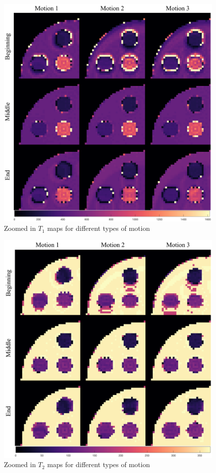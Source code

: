 \begin{figure}[ht]
    \centering
    \includegraphics[width=1\textwidth]{images/mrf/T1mapsmotionzoom}
    \caption{Zoomed in $T_1$ maps for different types of motion}
    \label{fig:appendixT1mapsmotionzoom}
\end{figure}

\begin{figure}[ht]
    \centering
    \includegraphics[width=1\textwidth]{images/mrf/T2mapsmotionzoom}
    \caption{Zoomed in $T_2$ maps for different types of motion}
    \label{fig:appendixT2mapsmotionzoom}
\end{figure}

